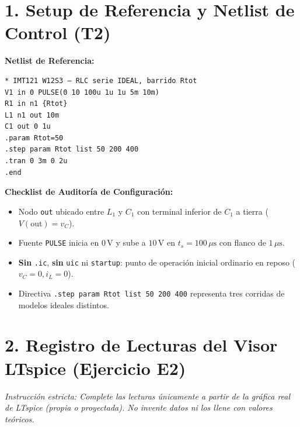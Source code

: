 \documentclass[11pt, a4paper]{article}
\begin{document}
\section*{1. Setup de Referencia y Netlist de Control (T2)}
\begin{minipage}[t]{0.52\textwidth}
\vspace{0pt}
\textbf{Netlist de Referencia:}
\begin{verbatim}
* IMT121 W12S3 — RLC serie IDEAL, barrido Rtot
V1 in 0 PULSE(0 10 100u 1u 1u 5m 10m)
R1 in n1 {Rtot}
L1 n1 out 10m
C1 out 0 1u
.param Rtot=50
.step param Rtot list 50 200 400
.tran 0 3m 0 2u
.end
\end{verbatim}
\end{minipage}%
\hfill
\begin{minipage}[t]{0.45\textwidth}
\vspace{0pt}
\textbf{Checklist de Auditoría de Configuración:}
\begin{itemize}\setlength\itemsep{0.1cm}
    \item[{[$\square$]}] Nodo \texttt{out} ubicado entre $L_1$ y $C_1$ con terminal inferior de $C_1$ a tierra ($V(\text{out}) = v_C$).
    \item[{[$\square$]}] Fuente \texttt{PULSE} inicia en $0\,\text{V}$ y sube a $10\,\text{V}$ en $t_s = 100\,\mu\text{s}$ con flanco de $1\,\mu\text{s}$.
    \item[{[$\square$]}] \textbf{Sin} \texttt{.ic}, \textbf{sin} \texttt{uic} ni \texttt{startup}: punto de operación inicial ordinario en reposo ($v_C=0, i_L=0$).
    \item[{[$\square$]}] Directiva \texttt{.step param Rtot list 50 200 400} representa tres corridas de modelos ideales distintos.
\end{itemize}
\end{minipage}

\section*{2. Registro de Lecturas del Visor LTspice (Ejercicio E2)}
\textit{Instrucción estricta: Complete las lecturas únicamente a partir de la gráfica real de LTspice (propia o proyectada). No invente datos ni los llene con valores teóricos.}
\end{document}
